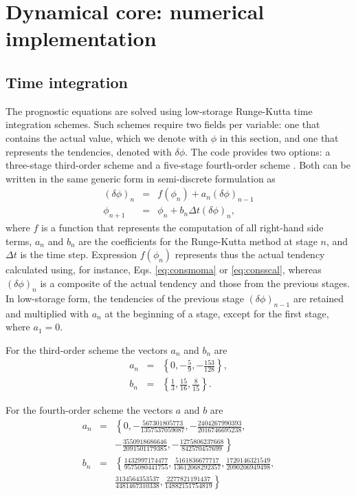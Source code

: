 \documentclass[gmd,manuscript]{copernicus}
\begin{document}
\section{Dynamical core: numerical implementation}\label{sec:dyncorediscrete}
\subsection{Time integration}
The prognostic equations are solved using low-storage Runge-Kutta time integration schemes. Such schemes require two fields per variable: one that contains the actual value, which we denote with $\phi$ in this section, and one that represents the tendencies, denoted with $\delta \phi$. The code provides two options: a three-stage third-order scheme \citep{Williamson1980} and a five-stage fourth-order scheme \citep{Carpenter1994}. Both can be written in the same generic form in semi-discrete formulation as
\begin{eqnarray}
\left( \delta \phi \right)_n & = & f \left( \phi_n \right) + a_n \left( \delta \phi \right)_{n-1} \\
\phi_{n+1} & = & \phi_n + b_n \Delta t \left( \delta \phi \right)_{n},
\end{eqnarray}
where $f$ is a function that represents the computation of all right-hand side terms, $a_n$ and $b_n$ are the coefficients for the Runge-Kutta method at stage $n$, and $\Delta t$ is the time step. Expression $f \left( \phi_n \right)$ represents thus the actual tendency calculated using, for instance, Eqs. \ref{eq:consmoma} or \ref{eq:consscal}, whereas $(\delta \phi)_n$ is a composite of the actual tendency and those from the previous stages. In low-storage form, the tendencies of the previous stage $\left( \delta \phi \right)_{n-1}$ are retained and multiplied with $a_n$ at the beginning of a stage, except for the first stage, where $a_1 = 0$. 

For the third-order scheme the vectors $a_n$ and $b_n$ are
\begin{eqnarray}
a_n & = & \left\{0, -\frac{5}{9}, -\frac{153}{128} \right\},\\
b_n & = & \left\{\frac{1}{3}, \frac{15}{16}, \frac{8}{15} \right\}.
\end{eqnarray}

For the fourth-order scheme the vectors $a$ and $b$ are
\begin{eqnarray}
\nonumber a_n & = & \left\{0, -\frac{567301805773}{1357537059087},
-\frac{2404267990393}{2016746695238},\right.\\
& & \left. -\frac{3550918686646}{2091501179385},
-\frac{1275806237668}{842570457699} \right\}\\
\nonumber b_n & = & \left\{\frac{1432997174477}{9575080441755}, \frac{5161836677717}{13612068292357},
\frac{1720146321549}{2090206949498},\right.\\
& & \left. \frac{3134564353537}{4481467310338},
\frac{2277821191437}{14882151754819} \right\}
\end{eqnarray}
\end{document}
